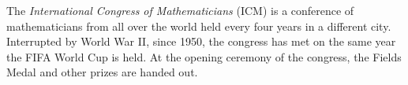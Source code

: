 \documentclass[12pt]{article}
\begin{document}
The {\em International Congress of Mathematicians} (ICM) is a conference of mathematicians from all over the world held every four years in a different city. Interrupted by World War II, since 1950, the congress has met on the same year the FIFA World Cup is held. At the opening ceremony of the congress, the Fields Medal and other prizes are handed out.
\end{document}
